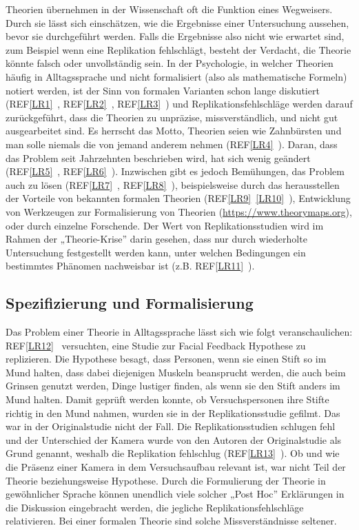 \documentclass[
  letterpaper,
  DIV=11,
  numbers=noendperiod]{scrreprt}
\begin{document}
Theorien übernehmen in der Wissenschaft oft die Funktion eines
Wegweisers. Durch sie lässt sich einschätzen, wie die Ergebnisse einer
Untersuchung aussehen, bevor sie durchgeführt werden. Falls die
Ergebnisse also nicht wie erwartet sind, zum Beispiel wenn eine
Replikation fehlschlägt, besteht der Verdacht, die Theorie könnte falsch
oder unvollständig sein. In der Psychologie, in welcher Theorien häufig
in Alltagssprache und nicht formalisiert (also als mathematische
Formeln) notiert werden, ist der Sinn von formalen Varianten schon lange
diskutiert (REF\hyperref[_msocom_1]{{[}LR1{]}}~,
REF\hyperref[_msocom_2]{{[}LR2{]}}~,
REF\hyperref[_msocom_3]{{[}LR3{]}}~) und Replikationsfehlschläge werden
darauf zurückgeführt, dass die Theorien zu unpräzise, missverständlich,
und nicht gut ausgearbeitet sind. Es herrscht das Motto, Theorien seien
wie Zahnbürsten und man solle niemals die von jemand anderem nehmen
(REF\hyperref[_msocom_4]{{[}LR4{]}}~). Daran, dass das Problem seit
Jahrzehnten beschrieben wird, hat sich wenig geändert
(REF\hyperref[_msocom_5]{{[}LR5{]}}~,
REF\hyperref[_msocom_6]{{[}LR6{]}}~). Inzwischen gibt es jedoch
Bemühungen, das Problem auch zu lösen
(REF\hyperref[_msocom_7]{{[}LR7{]}}~,
REF\hyperref[_msocom_8]{{[}LR8{]}}~), beispielsweise durch das
herausstellen der Vorteile von bekannten formalen Theorien
(REF\hyperref[_msocom_9]{{[}LR9{]}}~\hyperref[_msocom_10]{{[}LR10{]}}~),
Entwicklung von Werkzeugen zur Formalisierung von Theorien
(\url{https://www.theorymaps.org}), oder durch einzelne Forschende. Der
Wert von Replikationsstudien wird im Rahmen der „Theorie-Krise'' darin
gesehen, dass nur durch wiederholte Untersuchung festgestellt werden
kann, unter welchen Bedingungen ein bestimmtes Phänomen nachweisbar ist
(z.B. REF\hyperref[_msocom_11]{{[}LR11{]}}~).

\subsection{Spezifizierung und
Formalisierung}\label{spezifizierung-und-formalisierung}

Das Problem einer Theorie in Alltagssprache lässt sich wie folgt
veranschaulichen: REF\hyperref[_msocom_12]{{[}LR12{]}}~ versuchten, eine
Studie zur Facial Feedback Hypothese zu replizieren. Die Hypothese
besagt, dass Personen, wenn sie einen Stift so im Mund halten, dass
dabei diejenigen Muskeln beansprucht werden, die auch beim Grinsen
genutzt werden, Dinge lustiger finden, als wenn sie den Stift anders im
Mund halten. Damit geprüft werden konnte, ob Versuchspersonen ihre
Stifte richtig in den Mund nahmen, wurden sie in der Replikationsstudie
gefilmt. Das war in der Originalstudie nicht der Fall. Die
Replikationsstudien schlugen fehl und der Unterschied der Kamera wurde
von den Autoren der Originalstudie als Grund genannt, weshalb die
Replikation fehlschlug (REF\hyperref[_msocom_13]{{[}LR13{]}}~). Ob und
wie die Präsenz einer Kamera in dem Versuchsaufbau relevant ist, war
nicht Teil der Theorie beziehungsweise Hypothese. Durch die Formulierung
der Theorie in gewöhnlicher Sprache können unendlich viele solcher „Post
Hoc'' Erklärungen in die Diskussion eingebracht werden, die jegliche
Replikationsfehlschläge relativieren. Bei einer formalen Theorie sind
solche Missverständnisse seltener.
\end{document}

